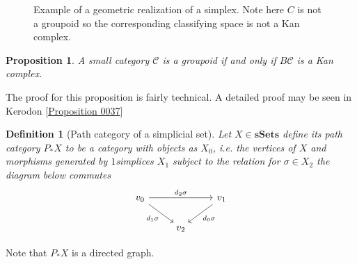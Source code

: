 \documentclass[12pt]{report}
\numberwithin{equation}{section}
\newtheorem{definition}[dummy]{Definition}
\newtheorem{proposition}[dummy]{Proposition}
\begin{document}
\begin{figure}[!htb]
		
		
	
		\caption{Example of a geometric realization of a simplex. Note here $C$ is not a groupoid so the corresponding classifying space is not a Kan complex.}
		\label{fig:exofnerve}
	\end{figure}

	
	
	\begin{proposition}
		A small category $\mathcal{C}$ is a groupoid if and only if $B\mathcal{C}$ is a Kan complex.
	\end{proposition} 
	The proof for this proposition is fairly technical. A detailed proof may be seen in Kerodon \cite{kerodon}[\href{https://kerodon.net/tag/0037}{Proposition 0037}]

	\begin{definition}[Path category of a simplicial set]
		Let \(X \in \mathbf{sSets}\) define its path category \(P_*X \) to be a category with objects as \(X_0\), i.e. the vertices of \(X\) and morphisms generated by \(1\)simplices \(X_1\) subject to the relation for \(\sigma \in X_2\) the diagram below commutes
		\[\begin{tikzcd}
			{v_0} && {v_1} \\
			& {v_2}
			\arrow["{d_2\sigma}", from=1-1, to=1-3]
			\arrow["{d_1\sigma}"', from=1-1, to=2-2]
			\arrow["{d_0\sigma}", from=1-3, to=2-2]
		\end{tikzcd}\]
	\end{definition}
	Note that $P_*X$ is a directed graph.	
\end{document}
